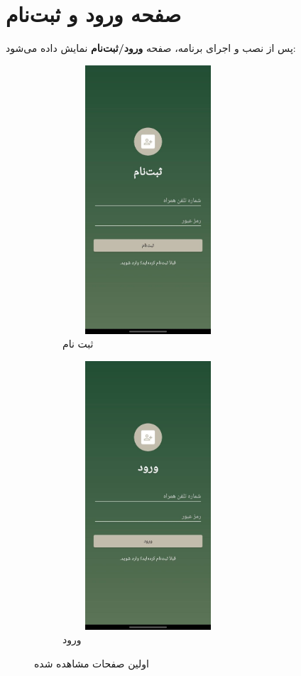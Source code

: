\documentclass{report}
\begin{document}
\section{صفحه ورود و ثبت‌نام}

پس از نصب و اجرای برنامه، صفحه \textbf{ورود/ثبت‌نام} نمایش داده می‌شود:
\begin{figure}[ht]
	\centering
	\begin{subfigure}[b]{0.3\textwidth}\centering
		\includegraphics[width=0.7\textwidth,height=10cm,keepaspectratio]{Pic/signup}
		\caption{ثبت نام}
		\label{fig:signup}
	\end{subfigure}
	\begin{subfigure}[b]{0.3\textwidth}\centering
		\includegraphics[width=0.7\textwidth,height=10cm,keepaspectratio]{Pic/login}
		\caption{ورود}
		\label{fig:login}
	\end{subfigure}
	\caption{اولین صفحات مشاهده شده}
	\label{fig:animals}
\end{figure}
\end{document}
